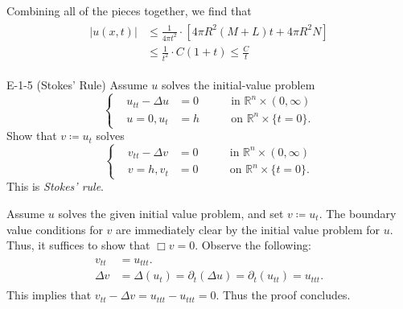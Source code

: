 \documentclass{article}
\begin{document}
	Combining all of the pieces together, we find that 
	\begin{align*}
		\begin{split}
			|u(x,t)| &\leq \frac{1}{4\pi t^2} \cdot \left[4\pi R^2(M + L)t + 4\pi R^2N\right] \\
			&\leq \frac{1}{t^2} \cdot C(1 + t) \leq \frac{C}{t}
		\end{split}
	\end{align*}
	
	\begin{prb}{E-1-5}
		(Stokes' Rule) Assume $u$ solves the initial-value problem 
		\begin{equation*}
			\left\{
			\begin{alignedat}{3}
				&u_{tt} - \Delta u &= 0 &\qquad \text{in $\mathbb{R}^n \times (0,\infty)$} \\
				&u =0, u_t &=h &\qquad \text{on $\mathbb{R}^n \times \{t = 0\}$}.
			\end{alignedat}
			\right.
		\end{equation*}
		Show that $v \coloneqq u_t$ solves 
		\begin{equation*}
			\left\{
			\begin{alignedat}{3}
				&v_{tt} - \Delta v &= 0 &\qquad \text{in $\mathbb{R}^n \times (0,\infty)$} \\
				&v =h, v_t &= 0 &\qquad \text{on $\mathbb{R}^n \times \{t = 0\}$}.
			\end{alignedat}
			\right.
		\end{equation*}
		This is \textit{Stokes' rule}. 
	\end{prb}
	Assume $u$ solves the given initial value problem, and set $v \coloneqq u_t$. The boundary value conditions for $v$ are immediately clear by the initial value problem for $u$. Thus, it suffices to show that $\Box v = 0$. Observe the following: 
	\begin{align*}
		\begin{split}
			v_{tt} &= u_{ttt}. \\
			\Delta v &= \Delta (u_{t}) = \partial_{t}(\Delta u) = \partial_t (u_{tt}) = u_{ttt}. 
		\end{split}
	\end{align*}
	This implies that $v_{tt} - \Delta v = u_{ttt} - u_{ttt} =0$. Thus the proof concludes. 
	
	\newpage 
\end{document}

